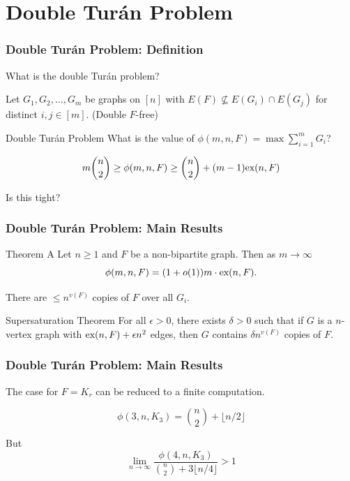 \documentclass{beamer}
\newcommand*{\ex}{\textnormal{ex}}
\begin{document}
\section{Double Turán Problem}

\begin{frame}
\frametitle{Double Turán Problem: Definition}

What is the double Turán problem? \pause

\vspace{0.5cm}

Let $G_1, G_2, \ldots, G_m$ be graphs on $[n]$ with $E(F) \not\subseteq E(G_i) \cap E(G_j)$ for distinct $i, j \in [m]$. \pause (\alert{Double $F$-free})

\pause

\begin{block}{Double Turán Problem}
  What is the value of $\phi(m, n, F) = \max \sum_{i = 1}^m G_i$?
\end{block}

\pause

\[
  m\binom{n}{2} \geq \phi(m, n, F) \geq \binom{n}{2} + (m - 1)\ex(n, F)
\]

\pause

Is this tight?
\end{frame}

\begin{frame}
  \frametitle{Double Turán Problem: Main Results}

  \begin{block}{Theorem A}
    Let $n \geq 1$ and $F$ be a non-bipartite graph. Then as $m \to \infty$
    \[ 
      \phi(m, n, F) = (1 + o(1))m \cdot \ex(n, F).
    \]
  \end{block}

  \pause

  \vspace{0.3cm}

  There are $\leq n^{v(F)}$ copies of $F$ over all $G_i$.

  \pause

  \begin{block}{Supersaturation Theorem \cite{ErdosSimonovits1983}}
    For all $\epsilon > 0$, there exists $\delta > 0$ such that if $G$ is a $n$-vertex graph with $\ex(n,F) + \epsilon n^2$ edges, then  $G$ contains $\delta n^{v(F)}$ copies of $F$.
  \end{block}
\end{frame}

\begin{frame}
  \frametitle{Double Turán Problem: Main Results}

  The case for $F = K_r$ can be reduced to a finite computation.

  \pause

  \[
    \phi(3, n, K_3) = \binom{n}{2} + \lfloor n/2\rfloor
  \]

  \pause
  
  But 
  \[
    \lim_{n \to \infty} \frac{\phi(4, n, K_3)}{\binom{n}{2} + 3\lfloor n/4\rfloor} > 1
  \]
\end{frame}
\end{document}
